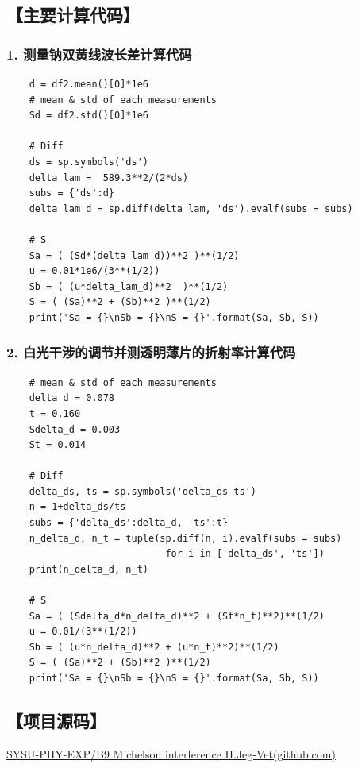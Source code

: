 \documentclass[12pt,a4paper,UTF8]{ctexart}
\begin{document}
\subsection*{【主要计算代码】}
\subsubsection*{1. 测量钠双黄线波长差计算代码}
\label{sec:code1}
\begin{lstlisting}
	d = df2.mean()[0]*1e6
	# mean & std of each measurements
	Sd = df2.std()[0]*1e6

	# Diff
	ds = sp.symbols('ds') 
	delta_lam =  589.3**2/(2*ds)
	subs = {'ds':d}
	delta_lam_d = sp.diff(delta_lam, 'ds').evalf(subs = subs) 

	# S
	Sa = ( (Sd*(delta_lam_d))**2 )**(1/2)
	u = 0.01*1e6/(3**(1/2)) 
	Sb = ( (u*delta_lam_d)**2  )**(1/2)
	S = ( (Sa)**2 + (Sb)**2 )**(1/2)
	print('Sa = {}\nSb = {}\nS = {}'.format(Sa, Sb, S))
\end{lstlisting}

\subsubsection*{2. 白光干涉的调节并测透明薄片的折射率计算代码}
\label{sec:code2}
\begin{lstlisting}
	# mean & std of each measurements
	delta_d = 0.078
	t = 0.160
	Sdelta_d = 0.003
	St = 0.014
	
	# Diff
	delta_ds, ts = sp.symbols('delta_ds ts') 
	n = 1+delta_ds/ts
	subs = {'delta_ds':delta_d, 'ts':t} 
	n_delta_d, n_t = tuple(sp.diff(n, i).evalf(subs = subs) 
	                        for i in ['delta_ds', 'ts'])  
	print(n_delta_d, n_t)
	
	# S
	Sa = ( (Sdelta_d*n_delta_d)**2 + (St*n_t)**2)**(1/2)
	u = 0.01/(3**(1/2)) 
	Sb = ( (u*n_delta_d)**2 + (u*n_t)**2)**(1/2)
	S = ( (Sa)**2 + (Sb)**2 )**(1/2)
	print('Sa = {}\nSb = {}\nS = {}'.format(Sa, Sb, S))
\end{lstlisting}

\subsection*{【项目源码】}
\href{https://github.com/Jeg-Vet/SYSU-PHY-EXP/tree/main/B9-Michelson_interference_II}{SYSU-PHY-EXP/B9 Michelson interference II.Jeg-Vet(github.com)}
		
\end{document}
